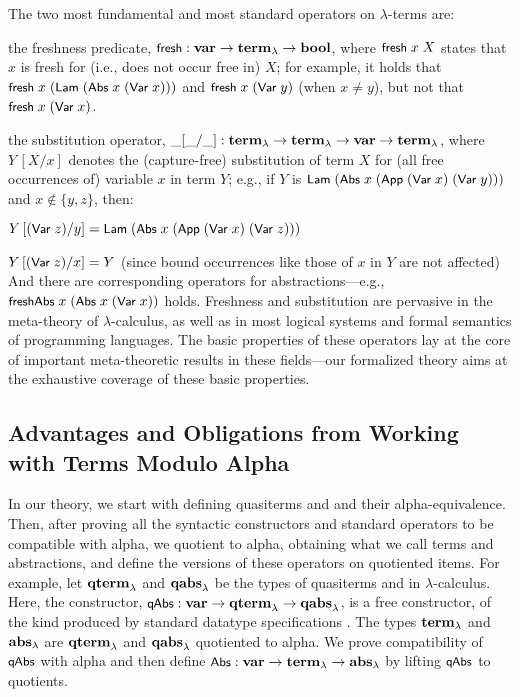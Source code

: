 \documentclass{llncs}
\newenvironment{myitem}[1][]
  {\itemize[leftmargin=*,topsep=0.3ex,itemsep=1pt, #1]}
  {\enditemize}
\begin{document}
The two most fundamental and most standard operators on $\lambda$-terms are: %
\begin{myitem}
\item the freshness predicate, $\mbox{\rm\textsf{\small fresh}} : \mbox{\bf var} \rightarrow \mbox{\bf term}_\lambda \rightarrow \mbox{\bf bool}$, 
where $\mbox{\rm\textsf{\small fresh}}\;x\;X$ states that $x$ is fresh for (i.e., does not occur free in) $X$; 
for example, it holds that $\mbox{\rm\textsf{\small fresh}}\;x\;(\mbox{\rm\textsf{\small Lam}}\;(\mbox{\rm\textsf{\small Abs}} \allowbreak\;x\;(\mbox{\rm\textsf{\small Var}}\;x)))$ and $\mbox{\rm\textsf{\small fresh}}\;x\;(\mbox{\rm\textsf{\small Var}}\;y)$ (when $x\not=y$), 
but not that $\mbox{\rm\textsf{\small fresh}}\;x\;(\mbox{\rm\textsf{\small Var}}\;x)$. 
\item the substitution operator, $\_[\_/\_] : \mbox{\bf term}_\lambda \rightarrow \mbox{\bf term}_\lambda \rightarrow \mbox{\bf var} \rightarrow \mbox{\bf term}_\lambda$, 
where $Y\,[X/x]$ denotes the (capture-free) substitution of %
term $X$ for (all free occurrences of) 
variable $x$ in %
term $Y$; 
e.g., 
if $Y$ is $\mbox{\rm\textsf{\small Lam}}\;(\mbox{\rm\textsf{\small Abs}}\;x\;(\mbox{\rm\textsf{\small App}}\;(\mbox{\rm\textsf{\small Var}}\;x)\;(\mbox{\rm\textsf{\small Var}}\;y)))$ and $x \not\in \{y,z\}$, then: 
\begin{myitem}
\item $Y\,[(\mbox{\rm\textsf{\small Var}}\;z)/y] = \mbox{\rm\textsf{\small Lam}}\;(\mbox{\rm\textsf{\small Abs}}\;x\;(\mbox{\rm\textsf{\small App}}\;(\mbox{\rm\textsf{\small Var}}\;x)\;(\mbox{\rm\textsf{\small Var}}\;z)))$
\item $Y\,[(\mbox{\rm\textsf{\small Var}}\;z)/x] = Y$ (since bound occurrences like those of $x$ in $Y$ are not affected)
\end{myitem}
\end{myitem}
%
And there are corresponding operators for abstractions---e.g., $\mbox{\rm\textsf{\small freshAbs}}\;x\;(\mbox{\rm\textsf{\small Abs}}\;x\;(\mbox{\rm\textsf{\small Var}}\;x))$ holds. 
Freshness and substitution are pervasive in the meta-theory of $\lambda$-calculus, as well as in most logical 
systems and formal semantics of programming languages. The basic properties of these operators 
lay at the core of %
important meta-theoretic results in these fields---our formalized theory aims at the exhaustive 
coverage of these basic properties.  
%

  
\subsection{Advantages and Obligations from Working with Terms Modulo Alpha}

In our theory, we start with defining quasiterms and \abstractions{} and their alpha-equivalence. 
Then, after proving all the syntactic constructors and standard operators to be compatible with alpha, we quotient 
to alpha, obtaining what we call terms and abstractions, and define the versions of these operators on 
quotiented items. 
%
For example, 
let $\mbox{\bf qterm}_\lambda$ and $\mbox{\bf qabs}_\lambda$ be the types  
of quasiterms and \abstractions{} in $\lambda$-calculus. Here, the \abstraction{} constructor, 
$\mbox{\rm\textsf{\small q\hspace*{-0.1ex}Abs}} : \mbox{\bf var} \rightarrow \mbox{\bf qterm}_\lambda \rightarrow \mbox{\bf qabs}_\lambda$, 
is a free %
constructor, of the kind produced by standard datatype 
specifications \cite{berghofer-wenzel-1999,blanchette-et-al-2014-tru}. 
%
The types $\mbox{\bf term}_\lambda$ and $\mbox{\bf abs}_\lambda$ are $\mbox{\bf qterm}_\lambda$ and $\mbox{\bf qabs}_\lambda$ quotiented to alpha.  
We prove compatibility of $\mbox{\rm\textsf{\small q\hspace*{-0.1ex}Abs}}$ with alpha %
and then define $\mbox{\rm\textsf{\small Abs}} : \mbox{\bf var} \rightarrow \mbox{\bf term}_\lambda \rightarrow \mbox{\bf abs}_\lambda$ by lifting $\mbox{\rm\textsf{\small q\hspace*{-0.1ex}Abs}}$ to quotients. 
\end{document}

